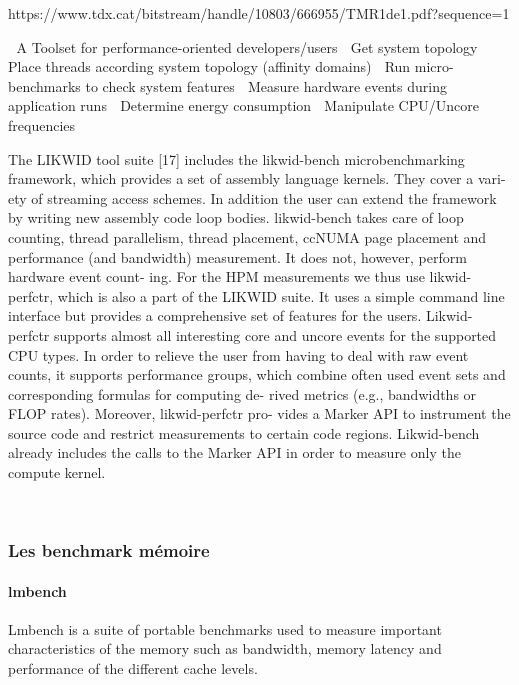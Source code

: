 https://www.tdx.cat/bitstream/handle/10803/666955/TMR1de1.pdf?sequence=1

 A Toolset for performance-oriented developers/users
 Get system topology
 Place threads according system topology (affinity domains)
 Run micro-benchmarks to check system features
 Measure hardware events during application runs
 Determine energy consumption
 Manipulate CPU/Uncore frequencies


The LIKWID tool suite [17] includes the likwid-bench microbenchmarking framework, which provides a set of assembly language kernels. They cover a vari- ety of streaming access schemes. In addition the user can extend the framework by writing new assembly code loop bodies. likwid-bench takes care of loop counting, thread parallelism, thread placement, ccNUMA page placement and performance (and bandwidth) measurement. It does not, however, perform hardware event count- ing. For the HPM measurements we thus use likwid-perfctr, which is also a part of the LIKWID suite. It uses a simple command line interface but provides a comprehensive set of features for the users. Likwid-perfctr supports almost all interesting core and uncore events for the supported CPU types. In order to relieve the user from having to deal with raw event counts, it supports performance groups, which combine often used event sets and corresponding formulas for computing de- rived metrics (e.g., bandwidths or FLOP rates). Moreover, likwid-perfctr pro- vides a Marker API to instrument the source code and restrict measurements to certain code regions. Likwid-bench already includes the calls to the Marker API in order to measure only the compute kernel.





~\\

\fi


\subsubsection{Les benchmark mémoire}


\paragraph{lmbench \cite{HPC:lmbench}} Lmbench is a suite of portable benchmarks used to measure important characteristics of the memory such as bandwidth, memory latency and performance of the different cache levels.

